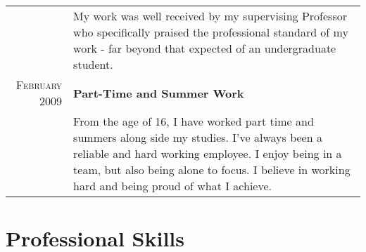 \documentclass[a4paper,11pt]{article}
\begin{document}
\begin{tabular}{r|p{12.5cm}}
        & \footnotesize{My work was well received by my supervising Professor who specifically praised the professional standard of my work - far beyond that expected of an undergraduate student.}
    \multicolumn{2}{c}{}\\
    \textsc{February 2009}
        & \textbf{Part-Time and Summer Work}\\
        & \footnotesize{From the age of 16, I have worked part time and summers along side my studies. I've always been a reliable and hard working employee. I enjoy being in a team, but also being alone to focus. I believe in working hard and being proud of what I achieve.}\\
        
\end{tabular}

\section{Professional Skills}
\end{document}
